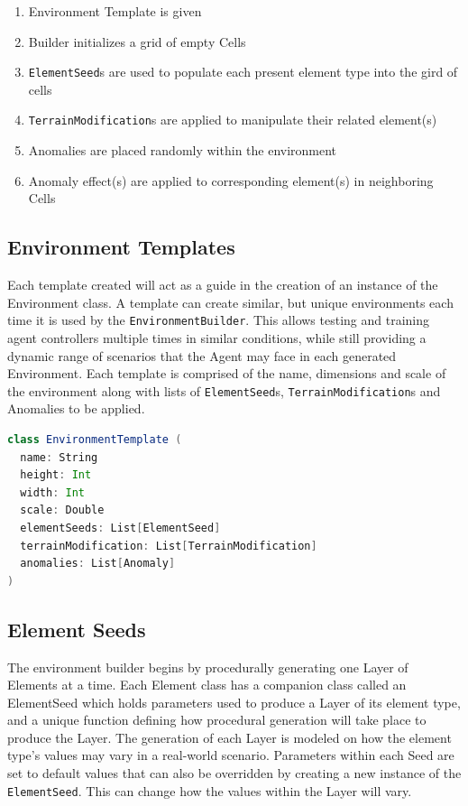 \begin{enumerate}
  \item Environment Template is given
  \item	Builder initializes a grid of empty Cells
  \item	\texttt{ElementSeed}s are used to populate each present element type into the gird of cells
  \item	\texttt{TerrainModification}s are applied to manipulate their related element(s)
  \item	Anomalies are placed randomly within the environment
  \item	Anomaly effect(s) are applied to corresponding element(s) in neighboring Cells
\end{enumerate}


\subsection{Environment Templates} \label{subsec:environment_templates}
Each template created will act as a guide in the creation of an instance of the Environment class.
A template can create similar, but unique environments each time it is used by the \texttt{EnvironmentBuilder}.
This allows testing and training agent controllers multiple times in similar conditions, while still providing a dynamic range of scenarios that the Agent may face in each generated Environment.
Each template is comprised of the name, dimensions and scale of the environment along with lists of \texttt{ElementSeed}s, \texttt{TerrainModification}s and Anomalies to be applied.

\begin{lstlisting}[language=Scala]
class EnvironmentTemplate (
  name: String
  height: Int
  width: Int
  scale: Double
  elementSeeds: List[ElementSeed]
  terrainModification: List[TerrainModification]
  anomalies: List[Anomaly]
)
\end{lstlisting}


\subsection{Element Seeds} \label{subsec:element_seeds}
The environment builder begins by procedurally generating one Layer of Elements at a time.
Each Element class has a companion class called an ElementSeed which holds parameters used to produce a Layer of its element type, and a unique function defining how procedural generation will take place to produce the Layer.
The generation of each Layer is modeled on how the element type's values may vary in a real-world scenario.
Parameters within each Seed are set to default values that can also be overridden by creating a new instance of the \texttt{ElementSeed}.
This can change how the values within the Layer will vary.

